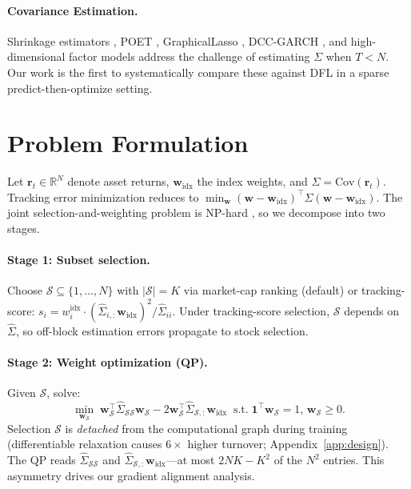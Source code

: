 \documentclass[letterpaper]{article}
\newcommand{\bw}{\mathbf{w}}
\newcommand{\br}{\mathbf{r}}
\newcommand{\bSigma}{\hat{\Sigma}}
\newcommand{\cS}{\mathcal{S}}
\begin{document}
\paragraph{Covariance Estimation.}
Shrinkage estimators \citep{ledoit2004well,ledoit2020analytical}, POET \citep{fan2013large}, GraphicalLasso \citep{friedman2008sparse}, DCC-GARCH \citep{engle2002dynamic}, and high-dimensional factor models \citep{fan2008high} address the challenge of estimating $\Sigma$ when $T < N$. Our work is the first to systematically compare these against DFL in a sparse predict-then-optimize setting.

\section{Problem Formulation}
\label{sec:formulation}

Let $\br_t \in \mathbb{R}^N$ denote asset returns, $\bw_{\text{idx}}$ the index weights, and $\Sigma = \text{Cov}(\br_t)$. Tracking error minimization reduces to $\min_\bw (\bw - \bw_{\text{idx}})^\top \Sigma (\bw - \bw_{\text{idx}})$. The joint selection-and-weighting problem is NP-hard \citep{beasley2003evolutionary}, so we decompose into two stages.

\paragraph{Stage 1: Subset selection.} Choose $\cS \subseteq \{1,\dots,N\}$ with $|\cS| = K$ via market-cap ranking (default) or tracking-score: $s_i = w_i^{\text{idx}} \cdot (\bSigma_{i,:} \bw_{\text{idx}})^2 / \bSigma_{ii}$. Under tracking-score selection, $\cS$ depends on $\bSigma$, so off-block estimation errors propagate to stock selection.

\paragraph{Stage 2: Weight optimization (QP).} Given $\cS$, solve:
\begin{equation}
  \min_{\bw_\cS} \; \bw_\cS^\top \bSigma_{\cS\cS} \bw_\cS - 2\bw_\cS^\top \bSigma_{\cS,:}\bw_{\text{idx}}
  \;\; \text{s.t.} \; \mathbf{1}^\top \bw_\cS {=} 1,\, \bw_\cS {\geq} 0.
  \label{eq:qp}
\end{equation}
Selection $\cS$ is \emph{detached} from the computational graph during training (differentiable relaxation causes $6\times$ higher turnover; Appendix~\ref{app:design}). The QP reads $\bSigma_{\cS\cS}$ and $\bSigma_{\cS,:}\bw_{\text{idx}}$---at most $2NK - K^2$ of the $N^2$ entries. This asymmetry drives our gradient alignment analysis.
\end{document}

